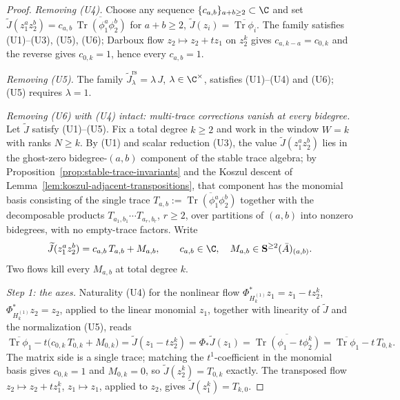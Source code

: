 \documentclass[11pt]{memoir}
\begin{document}
\begin{proof}
  \emph{Removing (U4).}  Choose any sequence
  \(\{c_{a,b}\}_{a+b\ge2}\subset\C\) and set
  \(\widetilde J(z_1^az_2^b)=c_{a,b}\,
   \overline{\operatorname{Tr}(\phi_1^a\phi_2^b)}\) for \(a+b\ge2\),
  \(\widetilde J(z_i)=\overline{\operatorname{Tr}\phi_i}\).  The
  family satisfies (U1)--(U3), (U5), (U6); Darboux flow
  \(z_2\mapsto z_2+tz_1\) on \(z_2^k\) gives \(c_{a,k-a}=c_{0,k}\)
  and the reverse gives \(c_{0,k}=1\), hence every \(c_{a,b}=1\).

  \emph{Removing (U5).}  The family
  \(\widetilde J^{\mathrm{rs}}_\lambda=\lambda\,J\),
  \(\lambda\in\C^\times\), satisfies (U1)--(U4) and (U6); (U5)
  requires \(\lambda=1\).

  \emph{Removing (U6) with (U4) intact: multi-trace corrections vanish
  at every bidegree.}  Let \(\widetilde J\) satisfy (U1)--(U5).  Fix a
  total degree \(k\geq2\) and work in the window \(W=k\) with ranks
  \(N\geq k\).  By (U1) and scalar reduction (U3), the value
  \(\widetilde J(z_1^az_2^b)\) lies in the ghost-zero bidegree-\((a,b)\)
  component of the stable trace algebra; by
  Proposition~\ref{prop:stable-trace-invariants} and the Koszul descent
  of Lemma~\ref{lem:koszul-adjacent-transpositions}, that component has
  the monomial basis consisting of the single trace
  \(T_{a,b}:=\overline{\operatorname{Tr}(\phi_1^a\phi_2^b)}\) together
  with the decomposable products
  \(T_{a_1,b_1}\cdots T_{a_r,b_r}\), \(r\geq2\), over partitions of
  \((a,b)\) into nonzero bidegrees, with no empty-trace factors.  Write
  \[
    \widetilde J(z_1^az_2^b)=c_{a,b}\,T_{a,b}+M_{a,b},
    \qquad
    c_{a,b}\in\C,\quad
    M_{a,b}\in\mathbf S^{\geq2}(\bar A)_{(a,b)} .
  \]
  Two flows kill every \(M_{a,b}\) at total degree \(k\).

  \emph{Step 1: the axes.}  Naturality (U4) for the nonlinear flow
  \(\Phi^*_{H_k^{(1)}}z_1=z_1-tz_2^k\),
  \(\Phi^*_{H_k^{(1)}}z_2=z_2\), applied to the linear monomial
  \(z_1\), together with linearity of \(\widetilde J\) and the
  normalization (U5), reads
  \[
    \overline{\operatorname{Tr}\phi_1}
    -t\bigl(c_{0,k}\,T_{0,k}+M_{0,k}\bigr)
    =\widetilde J(z_1-tz_2^k)
    =\Phi_*\widetilde J(z_1)
    =\overline{\operatorname{Tr}(\phi_1-t\phi_2^k)}
    =\overline{\operatorname{Tr}\phi_1}-t\,T_{0,k}.
  \]
  The matrix side is a single trace; matching the \(t^1\)-coefficient
  in the monomial basis gives \(c_{0,k}=1\) and \(M_{0,k}=0\), so
  \(\widetilde J(z_2^k)=T_{0,k}\) exactly.  The transposed flow
  \(z_2\mapsto z_2+tz_1^k\), \(z_1\mapsto z_1\), applied to \(z_2\),
  gives \(\widetilde J(z_1^k)=T_{k,0}\).


\end{proof}
\end{document}
